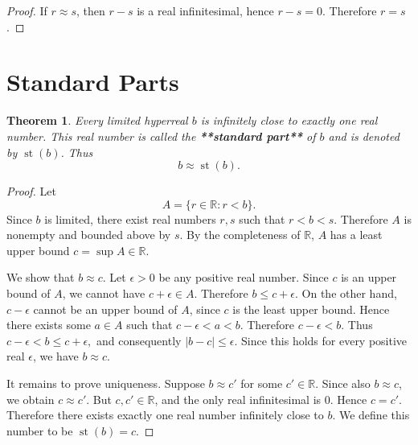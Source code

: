 \documentclass[10pt,a4paper]{book}
\newtheorem{theorem}{Theorem}[section]
\begin{document}
\begin{proof}

    If \(r\approx s\), then \(r-s\) is a real infinitesimal, hence \(r-s=0\).
    Therefore \(r=s\).

\end{proof}
\section{Standard Parts}

\begin{theorem}

    Every limited hyperreal $b$ is infinitely close to exactly one real number.
    This real number is called the \textbf{**standard part**} of $b$ and is denoted
    by $\operatorname{st}(b)$. Thus $$ b\approx\operatorname{st}(b). $$

\end{theorem}

\begin{proof}

    Let $$ A=\{r\in\mathbb R:r<b\}. $$ Since $b$ is limited, there exist real
    numbers $r,s$ such that $r<b<s$. Therefore $A$ is nonempty and bounded above by
    $s$. By the completeness of $\mathbb R$, $A$ has a least upper bound $ c=\sup
        A\in\mathbb R. $

    We show that $b\approx c$. Let $\epsilon>0$ be any positive real number. Since
    $c$ is an upper bound of $A$, we cannot have $c+\epsilon\in A$. Therefore $
        b\leq c+\epsilon. $ On the other hand, $c-\epsilon$ cannot be an upper bound
    of $A$, since $c$ is the least upper bound. Hence there exists some $a\in A$
    such that $c-\epsilon<a<b$. Therefore $ c-\epsilon<b. $ Thus $
        c-\epsilon<b\leq c+\epsilon, $ and consequently $ |b-c|\leq\epsilon. $ Since
    this holds for every positive real $\epsilon$, we have $ b\approx c. $

    It remains to prove uniqueness. Suppose $b\approx c'$ for some $c'\in\mathbb
        R$. Since also $b\approx c$, we obtain $ c\approx c'. $ But $c,c'\in\mathbb
        R$, and the only real infinitesimal is $0$. Hence $ c=c'. $ Therefore there
    exists exactly one real number infinitely close to $b$. We define this number
    to be $ \operatorname{st}(b)=c. $

\end{proof}
\end{document}
